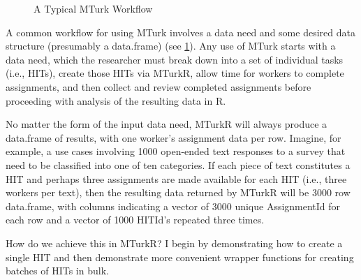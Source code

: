 \begin{figure}
\begin{center}
{}
\end{center}
\caption{A Typical MTurk Workflow}\label{fig:workflow}
\end{figure}

A common workflow for using MTurk involves a data need and some desired data structure (presumably a data.frame) (see \ref{fig:workflow}). Any use of MTurk starts with a data need, which the researcher must break down into a set of individual tasks (i.e., HITs), create those HITs via MTurkR, allow time for workers to complete assignments, and then collect and review completed assignments before proceeding with analysis of the resulting data in R. 

No matter the form of the input data need, MTurkR will always produce a data.frame of results, with one worker's assignment data per row. Imagine, for example, a use cases involving 1000 open-ended text responses to a survey that need to be classified into one of ten categories. If each piece of text constitutes a HIT and perhaps three assignments are made available for each HIT (i.e., three workers per text), then the resulting data returned by MTurkR will be 3000 row data.frame, with columns indicating a vector of 3000 unique AssignmentId for each row and a vector of 1000 HITId's repeated three times.

How do we achieve this in MTurkR? I begin by demonstrating how to create a single HIT and then demonstrate more convenient wrapper functions for creating batches of HITs in bulk.

